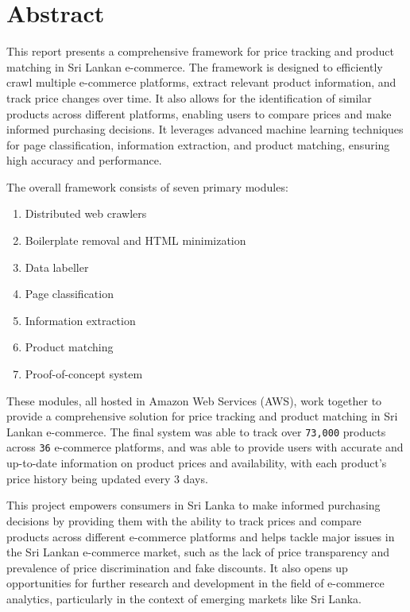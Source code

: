 \chapter*{Abstract}

This report presents a comprehensive framework for price tracking and product matching in Sri Lankan e-commerce.
The framework is designed to efficiently crawl multiple e-commerce platforms, extract relevant product information, and track price changes over time.
It also allows for the identification of similar products across different platforms, enabling users to compare prices and make informed purchasing decisions.
It leverages advanced machine learning techniques for page classification, information extraction, and product matching, ensuring high accuracy and performance.

The overall framework consists of seven primary modules:
\begin{enumerate}
    \item Distributed web crawlers
    \item Boilerplate removal and HTML minimization
    \item Data labeller
    \item Page classification
    \item Information extraction
    \item Product matching
    \item Proof-of-concept system
\end{enumerate}

These modules, all hosted in Amazon Web Services (AWS), work together to provide a comprehensive solution for price tracking and product matching in Sri Lankan e-commerce.
The final system was able to track over \texttt{73,000} products across \texttt{36} e-commerce platforms, and was able to provide users with accurate and up-to-date information on product prices and availability, with each product's price history being updated every 3 days.

This project empowers consumers in Sri Lanka to make informed purchasing decisions by providing them with the ability to track prices and compare products across different e-commerce platforms and helps tackle major issues in the Sri Lankan e-commerce market, such as the lack of price transparency and prevalence of price discrimination and fake discounts.
It also opens up opportunities for further research and development in the field of e-commerce analytics, particularly in the context of emerging markets like Sri Lanka.